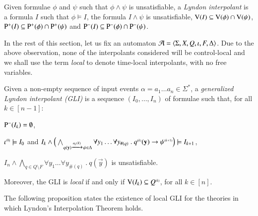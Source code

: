 \begin{definition}\label{def:lyndon-interpolant}
Given formulae $\phi$ and $\psi$ such that $\phi \wedge \psi$ is
unsatisfiable, a \emph{Lyndon interpolant} is a formula $I$ such that
$\phi \models I$, the formula $I \wedge \psi$ is unsatisfiable,
$\mathrm{V}({I}) \subseteq \mathrm{V}({\phi}) \cap \mathrm{V}({\psi})$, $\mathrm{P}^{+}(I) \subseteq
\mathrm{P}^{+}(\phi) \cap \mathrm{P}^{+}(\psi)$ and $\mathrm{P}^{-}(I) \subseteq
\mathrm{P}^{-}(\phi) \cap \mathrm{P}^{-}(\psi)$.
\end{definition}

In the rest of this section, let us fix an automaton $\mathcal{A} =
\langle \Sigma,X,Q,\iota,F,\Delta \rangle$. Due to the above observation, none
of the interpolants considered will be control-local and we shall use
the term \emph{local} to denote time-local interpolants, with no free
variables.

\begin{definition}\label{def:generalized-lyndon-interpolant}
  Given a non-empty sequence of input events $\alpha = a_1 \ldots a_n
  \in \Sigma^*$, a \emph{generalized Lyndon interpolant (GLI)} is a
  sequence $(I_0,\ldots,I_n)$ of formulae such that, for all $k \in
  [n-1]$: \begin{compactenum}
    \item\label{it1:generalized-lyndon-interpolant} $\mathrm{P}^{-}(I_k) =
      \emptyset$,
    \item\label{it2:generalized-lyndon-interpolant} ${\iota}^{\scriptscriptstyle{({0})}}
      \models I_0$ and \(I_k \wedge \Big(\bigwedge_{q(\mathbf y)
        \xrightarrow{{\scriptscriptstyle a_i(X)}}_{{\scriptstyle }} \psi \in \Delta} \forall y_1 \ldots \forall
      y_{\#(q)} ~.~ {q}^{\scriptscriptstyle{({k})}}(\mathbf y) \rightarrow
      {\psi}^{\scriptscriptstyle{({k+1})}}\Big) \models I_{k+1}\),
    \item\label{it3:generalized-lyndon-interpolant} $I_n \wedge
      \bigwedge_{q \in Q \setminus F} \forall y_1 \ldots \forall
      y_{\#(q)} ~.~ q(\vec{y})$ is unsatisfiable.
  \end{compactenum}
  Moreover, the GLI is \emph{local} if and only if $\mathrm{V}({I_k})
  \subseteq {Q}^{\scriptscriptstyle{({k})}}$, for all $k \in [n]$.
\end{definition}
The following proposition states the existence of local GLI for the
theories in which Lyndon's Interpolation Theorem holds.

